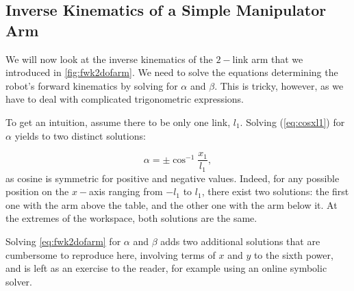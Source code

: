 \subsection{Inverse Kinematics of a Simple Manipulator Arm}\label{sec:kinematics:inverse:arm}

We will now look at the inverse kinematics of the $2-$link arm that we introduced in \cref{fig:fwk2dofarm}. We need to solve the equations determining the robot's forward kinematics by solving for $\alpha$ and $ \beta$.
This is tricky, however, as we have to deal with complicated trigonometric expressions.

To get an intuition, assume there to be only one link, $l_1$.  Solving (\ref{eq:cosxl1}) for $\alpha$ yields to two distinct solutions:

\begin{equation}
\alpha = \pm \cos^{-1}\frac{x_1}{l_1},
\end{equation}
as cosine is symmetric for positive and negative values.
Indeed, for any possible position on the $x-$axis ranging from $-l_1$ to $l_1$, there exist two solutions: the first one with the arm above the table, and the other one with the arm below it.
At the extremes of the workspace, both solutions are the same.


Solving \ref{eq:fwk2dofarm} for $\alpha$ and $\beta$ adds two additional solutions that are cumbersome to reproduce here, involving terms of $x$ and $y$ to the sixth power, and is left as an exercise to the reader, for example using an online symbolic solver.


